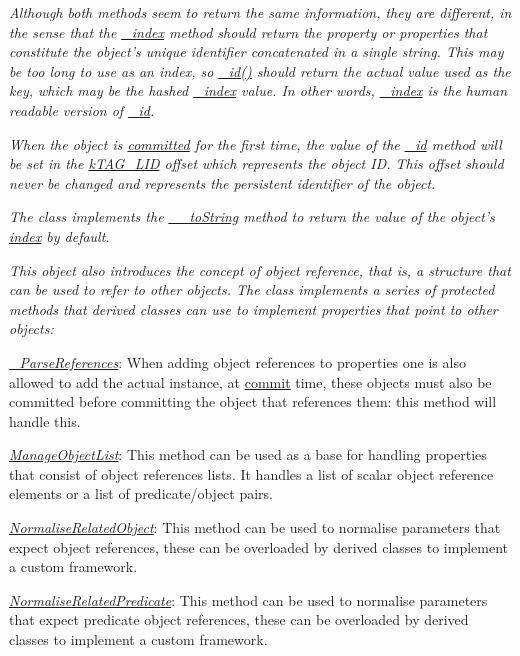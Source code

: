 {\itshape Although both methods seem to return the same information, they are different, in the sense that the \hyperlink{}{\-\_\-index} method should return the property or properties that constitute the object's unique identifier concatenated in a single string. This may be too long to use as an index, so \hyperlink{}{\-\_\-id()} should return the actual value used as the key, which may be the hashed \hyperlink{}{\-\_\-index} value. In other words, \hyperlink{}{\-\_\-index} is the human readable version of \hyperlink{}{\-\_\-id}.}

{\itshape When the object is \hyperlink{}{committed} for the first time, the value of the \hyperlink{}{\-\_\-id} method will be set in the \hyperlink{}{k\-T\-A\-G\-\_\-\-L\-I\-D} offset which represents the object I\-D. This offset should never be changed and represents the persistent identifier of the object.}

{\itshape The class implements the \hyperlink{}{\-\_\-\-\_\-to\-String} method to return the value of the object's \hyperlink{}{index} by default.}

{\itshape This object also introduces the concept of object reference, that is, a structure that can be used to refer to other objects. The class implements a series of protected methods that derived classes can use to implement properties that point to other objects\-:}

{\itshape 
\begin{DoxyItemize}
\item {\itshape \hyperlink{}{\-\_\-\-Parse\-References}}\-: When adding object references to properties one is also allowed to add the actual instance, at \hyperlink{}{commit} time, these objects must also be committed before committing the object that references them\-: this method will handle this. 
\item {\itshape \hyperlink{class_c_attribute_a58d5de30d4a6ea29f485a266460a2bdd}{Manage\-Object\-List}}\-: This method can be used as a base for handling properties that consist of object references lists. It handles a list of scalar object reference elements or a list of predicate/object pairs. 
\item {\itshape \hyperlink{}{Normalise\-Related\-Object}}\-: This method can be used to normalise parameters that expect object references, these can be overloaded by derived classes to implement a custom framework. 
\item {\itshape \hyperlink{}{Normalise\-Related\-Predicate}}\-: This method can be used to normalise parameters that expect predicate object references, these can be overloaded by derived classes to implement a custom framework. 
\end{DoxyItemize}}

